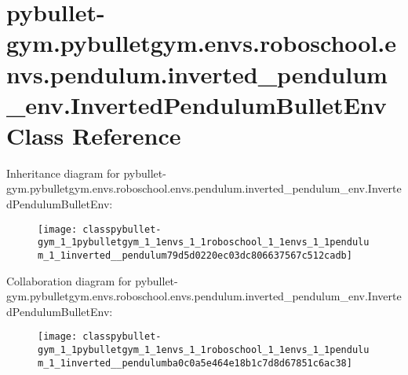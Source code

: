 \hypertarget{classpybullet-gym_1_1pybulletgym_1_1envs_1_1roboschool_1_1envs_1_1pendulum_1_1inverted__pendulum31d47d8094f7022182666018f100e6e7}{}\section{pybullet-\/gym.pybulletgym.\+envs.\+roboschool.\+envs.\+pendulum.\+inverted\+\_\+pendulum\+\_\+env.\+Inverted\+Pendulum\+Bullet\+Env Class Reference}
\label{classpybullet-gym_1_1pybulletgym_1_1envs_1_1roboschool_1_1envs_1_1pendulum_1_1inverted__pendulum31d47d8094f7022182666018f100e6e7}


Inheritance diagram for pybullet-\/gym.pybulletgym.\+envs.\+roboschool.\+envs.\+pendulum.\+inverted\+\_\+pendulum\+\_\+env.\+Inverted\+Pendulum\+Bullet\+Env\+:
\nopagebreak
\begin{figure}[H]
\begin{center}
\leavevmode
\texttt{[image: classpybullet-gym\_1\_1pybulletgym\_1\_1envs\_1\_1roboschool\_1\_1envs\_1\_1pendulum\_1\_1inverted\_\_pendulum79d5d0220ec03dc806637567c512cadb]}
\end{center}
\end{figure}


Collaboration diagram for pybullet-\/gym.pybulletgym.\+envs.\+roboschool.\+envs.\+pendulum.\+inverted\+\_\+pendulum\+\_\+env.\+Inverted\+Pendulum\+Bullet\+Env\+:
\nopagebreak
\begin{figure}[H]
\begin{center}
\leavevmode
\texttt{[image: classpybullet-gym\_1\_1pybulletgym\_1\_1envs\_1\_1roboschool\_1\_1envs\_1\_1pendulum\_1\_1inverted\_\_pendulumba0c0a5e464e18b1c7d8d67851c6ac38]}
\end{center}
\end{figure}
